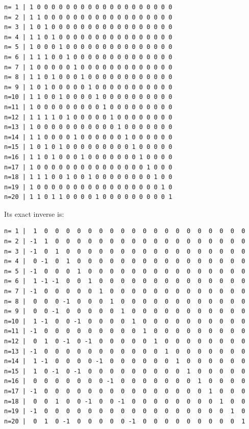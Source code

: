 \documentclass[11pt]{amsart}
\numberwithin{equation}{section}
\theoremstyle{plain}
\theoremstyle{definition}
\theoremstyle{remark}
\begin{document}
\begingroup
\scriptsize
\begin{verbatim}
n= 1 | 1 0 0 0 0 0 0 0 0 0 0 0 0 0 0 0 0 0 0 0
n= 2 | 1 1 0 0 0 0 0 0 0 0 0 0 0 0 0 0 0 0 0 0
n= 3 | 1 0 1 0 0 0 0 0 0 0 0 0 0 0 0 0 0 0 0 0
n= 4 | 1 1 0 1 0 0 0 0 0 0 0 0 0 0 0 0 0 0 0 0
n= 5 | 1 0 0 0 1 0 0 0 0 0 0 0 0 0 0 0 0 0 0 0
n= 6 | 1 1 1 0 0 1 0 0 0 0 0 0 0 0 0 0 0 0 0 0
n= 7 | 1 0 0 0 0 0 1 0 0 0 0 0 0 0 0 0 0 0 0 0
n= 8 | 1 1 0 1 0 0 0 1 0 0 0 0 0 0 0 0 0 0 0 0
n= 9 | 1 0 1 0 0 0 0 0 1 0 0 0 0 0 0 0 0 0 0 0
n=10 | 1 1 0 0 1 0 0 0 0 1 0 0 0 0 0 0 0 0 0 0
n=11 | 1 0 0 0 0 0 0 0 0 0 1 0 0 0 0 0 0 0 0 0
n=12 | 1 1 1 1 0 1 0 0 0 0 0 1 0 0 0 0 0 0 0 0
n=13 | 1 0 0 0 0 0 0 0 0 0 0 0 1 0 0 0 0 0 0 0
n=14 | 1 1 0 0 0 0 1 0 0 0 0 0 0 1 0 0 0 0 0 0
n=15 | 1 0 1 0 1 0 0 0 0 0 0 0 0 0 1 0 0 0 0 0
n=16 | 1 1 0 1 0 0 0 1 0 0 0 0 0 0 0 1 0 0 0 0
n=17 | 1 0 0 0 0 0 0 0 0 0 0 0 0 0 0 0 1 0 0 0
n=18 | 1 1 1 0 0 1 0 0 1 0 0 0 0 0 0 0 0 1 0 0
n=19 | 1 0 0 0 0 0 0 0 0 0 0 0 0 0 0 0 0 0 1 0
n=20 | 1 1 0 1 1 0 0 0 0 1 0 0 0 0 0 0 0 0 0 1
\end{verbatim}
\endgroup

Its exact inverse is:

\begingroup
\scriptsize
\begin{verbatim}
n= 1 |  1  0  0  0  0  0  0  0  0  0  0  0  0  0  0  0  0  0  0  0
n= 2 | -1  1  0  0  0  0  0  0  0  0  0  0  0  0  0  0  0  0  0  0
n= 3 | -1  0  1  0  0  0  0  0  0  0  0  0  0  0  0  0  0  0  0  0
n= 4 |  0 -1  0  1  0  0  0  0  0  0  0  0  0  0  0  0  0  0  0  0
n= 5 | -1  0  0  0  1  0  0  0  0  0  0  0  0  0  0  0  0  0  0  0
n= 6 |  1 -1 -1  0  0  1  0  0  0  0  0  0  0  0  0  0  0  0  0  0
n= 7 | -1  0  0  0  0  0  1  0  0  0  0  0  0  0  0  0  0  0  0  0
n= 8 |  0  0  0 -1  0  0  0  1  0  0  0  0  0  0  0  0  0  0  0  0
n= 9 |  0  0 -1  0  0  0  0  0  1  0  0  0  0  0  0  0  0  0  0  0
n=10 |  1 -1  0  0 -1  0  0  0  0  1  0  0  0  0  0  0  0  0  0  0
n=11 | -1  0  0  0  0  0  0  0  0  0  1  0  0  0  0  0  0  0  0  0
n=12 |  0  1  0 -1  0 -1  0  0  0  0  0  1  0  0  0  0  0  0  0  0
n=13 | -1  0  0  0  0  0  0  0  0  0  0  0  1  0  0  0  0  0  0  0
n=14 |  1 -1  0  0  0  0 -1  0  0  0  0  0  0  1  0  0  0  0  0  0
n=15 |  1  0 -1  0 -1  0  0  0  0  0  0  0  0  0  1  0  0  0  0  0
n=16 |  0  0  0  0  0  0  0 -1  0  0  0  0  0  0  0  1  0  0  0  0
n=17 | -1  0  0  0  0  0  0  0  0  0  0  0  0  0  0  0  1  0  0  0
n=18 |  0  0  1  0  0 -1  0  0 -1  0  0  0  0  0  0  0  0  1  0  0
n=19 | -1  0  0  0  0  0  0  0  0  0  0  0  0  0  0  0  0  0  1  0
n=20 |  0  1  0 -1  0  0  0  0  0 -1  0  0  0  0  0  0  0  0  0  1
\end{verbatim}
\endgroup
\end{document}
